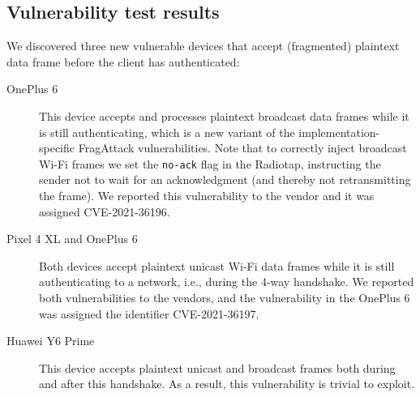\documentclass[sigconf]{acmart}
\newcommand{\wifi}{\mbox{Wi-Fi}}
\newcommand{\red}[1]{\textcolor{red}{#1}}
\begin{document}

\subsection{Vulnerability test results}

We discovered three new vulnerable devices that accept (fragmented) plaintext data frame before the client has authenticated:
\begin{description}

    \item[OnePlus 6]
	This device accepts and processes plaintext broadcast data frames while it is still authenticating,
	which is a new variant of the implementation-specific FragAttack vulnerabilities.
	Note that to correctly inject broadcast \wifi{} frames we set the \verb|no-ack| flag in the Radiotap, instructing the sender not to wait for an acknowledgment (and thereby not retransmitting the frame).
	We reported this vulnerability to the vendor and it was assigned \mbox{CVE-2021-36196}.


    \item[Pixel 4 XL and OnePlus 6]
	Both devices accept plaintext unicast \wifi{} data frames while it is still
	authenticating to a network, i.e., during the \mbox{4-way} handshake.
	We reported both vulnerabilities to the vendors, and the vulnerability in the OnePlus 6 was assigned the identifier CVE-2021-36197.


	\item[Huawei Y6 Prime]
	This device accepts plaintext unicast and broadcast frames both during and after this handshake.
	As a result, this vulnerability is trivial to exploit.

\end{description}
\end{document}
